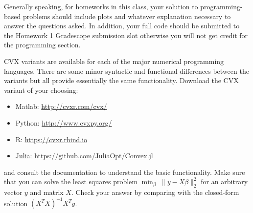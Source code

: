 Generally speaking, for homeworks in this class, your solution to programming-based problems should include plots and whatever explanation necessary to answer the questions asked. In addition, your full code should be submitted to the Homework 1 Gradescope submission slot otherwise you will not get credit for the programming section.

CVX variants are available for each of the major numerical programming
languages. There are some minor syntactic and functional differences between the
variants but all provide essentially the same functionality.  Download the CVX
variant of your choosing: 
\begin{itemize}
\item Matlab: \url{http://cvxr.com/cvx/}
\item Python: \url{http://www.cvxpy.org/}
\item R: \url{https://cvxr.rbind.io}
\item Julia: \url{https://github.com/JuliaOpt/Convex.jl}
\end{itemize}
and consult the documentation to understand the basic functionality. Make sure 
that you can solve the least squares problem $\min_\beta \; \|y-X\beta\|_2^2$
for an arbitrary vector $y$ and matrix $X$. Check your answer by comparing with
the closed-form solution $(X^T X)^{-1} X^T y$. 

